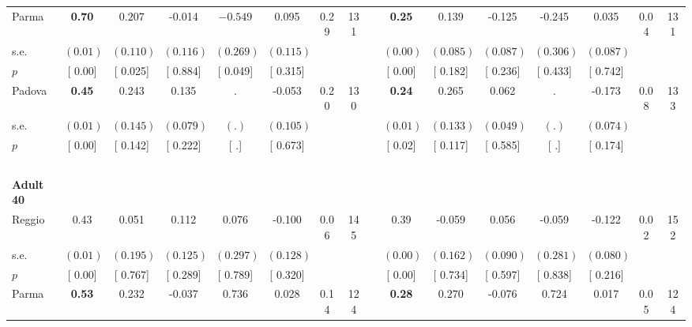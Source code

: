\begin{longtable}{L{8em} c c c c c c c p{1em} c c c c c c c}
\quad \quad \quad Parma& \textbf{     0.70} & $ \mathbf{    0.207}$ &    -0.014 & $ \mathbf{   -0.549}$ &     0.095 &      0.29 &       131 & & \textbf{     0.25} &     0.139 &    -0.125 &    -0.245 &     0.035 &      0.04 &       131  \\*
\quad \quad \quad \quad s.e.& $ (     0.01)$ & $ (    0.110)$ & $ (    0.116)$ & $ (    0.269)$ & $ (    0.115)$ & & & & $ (     0.00)$ & $ (    0.085)$ & $ (    0.087)$ & $ (    0.306)$ & $ (    0.087)$ & &  \\*
\quad \quad \quad \quad $ p$ & [     0.00] & [    0.025] & [    0.884] & [    0.049] & [    0.315] & & & & [     0.00] & [    0.182] & [    0.236] & [    0.433] & [    0.742] & &  \\[1em]
\quad \quad \quad Padova& \textbf{     0.45} &     0.243 &     0.135 &         . &    -0.053 &      0.20 &       130 & & \textbf{     0.24} &     0.265 &     0.062 &         . &    -0.173 &      0.08 &       133  \\*
\quad \quad \quad \quad s.e.& $ (     0.01)$ & $ (    0.145)$ & $ (    0.079)$ & $ (        .)$ & $ (    0.105)$ & & & & $ (     0.01)$ & $ (    0.133)$ & $ (    0.049)$ & $ (        .)$ & $ (    0.074)$ & &  \\*
\quad \quad \quad \quad $ p$ & [     0.00] & [    0.142] & [    0.222] & [        .] & [    0.673] & & & & [     0.02] & [    0.117] & [    0.585] & [        .] & [    0.174] & &  \\[1em]
~\\[1em]
\quad \quad \textbf{Adult 40} & & & & & & & & & & & & & & & \\* 
\quad \quad \quad Reggio& 0.43 &     0.051 &     0.112 &     0.076 &    -0.100 &      0.06 &       145 & & 0.39 &    -0.059 &     0.056 &    -0.059 &    -0.122 &      0.02 &       152  \\*
\quad \quad \quad \quad s.e.& $ (     0.01)$ & $ (    0.195)$ & $ (    0.125)$ & $ (    0.297)$ & $ (    0.128)$ & & & & $ (     0.00)$ & $ (    0.162)$ & $ (    0.090)$ & $ (    0.281)$ & $ (    0.080)$ & &  \\*
\quad \quad \quad \quad $ p$ & [     0.00] & [    0.767] & [    0.289] & [    0.789] & [    0.320] & & & & [     0.00] & [    0.734] & [    0.597] & [    0.838] & [    0.216] & &  \\[1em]
\quad \quad \quad Parma& \textbf{     0.53} &     0.232 &    -0.037 &     0.736 &     0.028 &      0.14 &       124 & & \textbf{     0.28} & $ \mathbf{    0.270}$ &    -0.076 &     0.724 &     0.017 &      0.05 &       124  \\*

\end{longtable}
